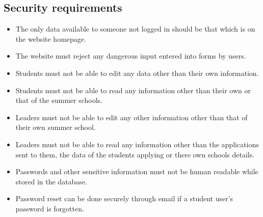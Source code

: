 \documentclass{project}
\begin{document}
\subsection{Security requirements}
\begin{itemize}
\item The only data available to someone not logged in should be that which is on the website homepage.
\item The website must reject any dangerous input entered into forms by users.
\item Students must not be able to edit any data other than their own information.
\item Students must not be able to read any information other than their own or that of the summer schools.
\item Leaders must not be able to edit any other information other than that of their own summer school.
\item Leaders must not be able to read any information other than the applications sent to them, the data of the students applying or there own schools details. 
\item Passwords and other sensitive information must not be human readable while stored in the database.
\item Password reset can be done securely through email if a student user's password is forgotten.
\end{itemize}
\newpage
\end{document}
